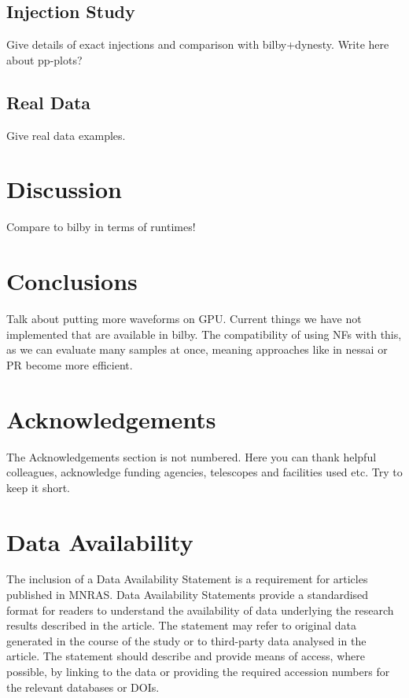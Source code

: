 \documentclass[fleqn,usenatbib]{mnras}
\begin{document}
\subsection{Injection Study}

Give details of exact injections and comparison with bilby+dynesty. Write here about pp-plots?

\subsection{Real Data}

Give real data examples.

\section{Discussion}

Compare to bilby in terms of runtimes!

\section{Conclusions}

Talk about putting more waveforms on GPU. Current things we have not implemented that are available in bilby. The compatibility of using NFs with this, as we can evaluate many samples at once, meaning approaches like in nessai or PR become more efficient. 

\section*{Acknowledgements}

The Acknowledgements section is not numbered. Here you can thank helpful
colleagues, acknowledge funding agencies, telescopes and facilities used etc.
Try to keep it short.

\section*{Data Availability}

 
The inclusion of a Data Availability Statement is a requirement for articles published in MNRAS. Data Availability Statements provide a standardised format for readers to understand the availability of data underlying the research results described in the article. The statement may refer to original data generated in the course of the study or to third-party data analysed in the article. The statement should describe and provide means of access, where possible, by linking to the data or providing the required accession numbers for the relevant databases or DOIs.
\end{document}
